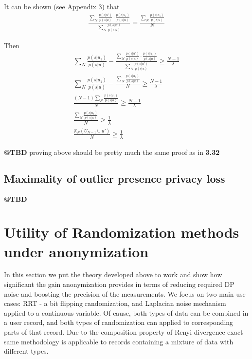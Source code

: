 \documentclass[11pt]{article}
\begin{document}
It can be shown (see Appendix 3)  that
\begin{align}
\frac{ \sum_N  \frac{ p(s | u') } { p(s | u) } \cdot \frac{ p(s | u_1) } { p(s | u)}  }  {  \sum_N  \frac{ p(s | u') } { p(s | u) } }  =  \frac{\sum_N \frac{ p(s | u_1) } { p(s | u)}}{N}
\end{align}

Then
\begin{align}
\sum_N \frac{ p(s | u_1) } { p(s | u)}   - \frac{ \sum_N  \frac{ p(s | u') } { p(s | u) } \cdot \frac{ p(s | u_1) } { p(s | u)}  }  {  \sum_N  \frac{ p(s | u') } { p(s | u) } }  \ge \frac{N-1}{\lambda}  \\
\sum_N \frac{ p(s | u_1) } { p(s | u)}   -  \frac{\sum_N \frac{ p(s | u_1) } { p(s | u)}}{N}  \ge \frac{N-1}{\lambda}  \\
\frac{(N-1)\sum_N \frac{ p(s | u_1) } { p(s | u)}}{N}  \ge \frac{N-1}{\lambda}  \\
\frac{\sum_N \frac{ p(s | u_1) } { p(s | u)}}{N}  \ge \frac{1}{\lambda} \\
\frac{\mathbb{X}_N(U_{N-1} \cup u')}{N} \ge \frac{1}{\lambda} 
\end{align}

\textbf{@TBD} proving above should be pretty much the same proof as in \textbf{3.32}

\subsection{Maximality of outlier presence privacy loss}
\textbf{@TBD}  

\section{Utility of Randomization methods under anonymization}
In this section we put the theory developed above to work and show how significant the gain anonymization provides in terms of reducing required DP noise and boosting the precision of the measurements.  We focus on two main use cases:  RRT - a bit flipping randomization, and Laplacian noise mechanism applied to a continuous variable.  Of cause, both types of data can be combined in a user record, and both types of randomization can applied to corresponding parts of that record. Due to the composition property of Renyi  divergence exact same methodology is applicable to records containing a mixture of data with different types. 
\end{document}
